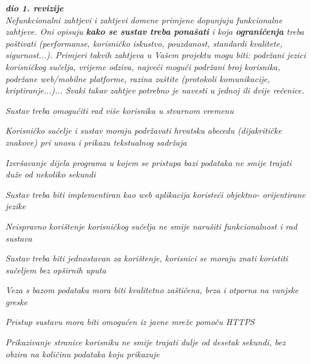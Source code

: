 			\textbf{\textit{dio 1. revizije}}\\
		 
			 \textit{Nefunkcionalni zahtjevi i zahtjevi domene primjene dopunjuju funkcionalne zahtjeve. Oni opisuju \textbf{kako se sustav treba ponašati} i koja \textbf{ograničenja} treba poštivati (performanse, korisničko iskustvo, pouzdanost, standardi kvalitete, sigurnost...). Primjeri takvih zahtjeva u Vašem projektu mogu biti: podržani jezici korisničkog sučelja, vrijeme odziva, najveći mogući podržani broj korisnika, podržane web/mobilne platforme, razina zaštite (protokoli komunikacije, kriptiranje...)... Svaki takav zahtjev potrebno je navesti u jednoj ili dvije rečenice.}

			\begin{packed_item}

				\item \textit{Sustav treba omogućiti rad više korisnika u stvarnom vremenu}
				\item \textit{Korisničko sučelje i sustav moraju podržavati hrvatsku abecedu (dijakritičke
				znakove) pri unosu i prikazu tekstualnog sadržaja}
				\item \textit{Izvršavanje dijela programa u kojem se pristupa bazi podataka ne smije trajati
				duže od nekoliko sekundi}
				\item \textit{Sustav treba biti implementiran kao web aplikacija koristeći
				objektno- orijentirane jezike}
				\item \textit{Neispravno korištenje korisničkog sučelja ne smije narušiti funkcionalnost i
				rad sustava}
				\item \textit{Sustav treba biti jednostavan za korištenje, korisnici se moraju znati koristiti
				sučeljem bez opširnih uputa}
				\item \textit{Veza s bazom podataka mora biti kvalitetno zaštičena, brza i otporna na
				vanjske greske}
				\item \textit{Pristup sustavu mora biti omogućen iz javne mreže pomoču HTTPS}
				\item \textit{Prikazivanje stranice korisniku ne smije trajati dulje od desetak sekundi,
				bez obzira na količinu podataka koju prikazuje}

			\end{packed_item}
			 
	